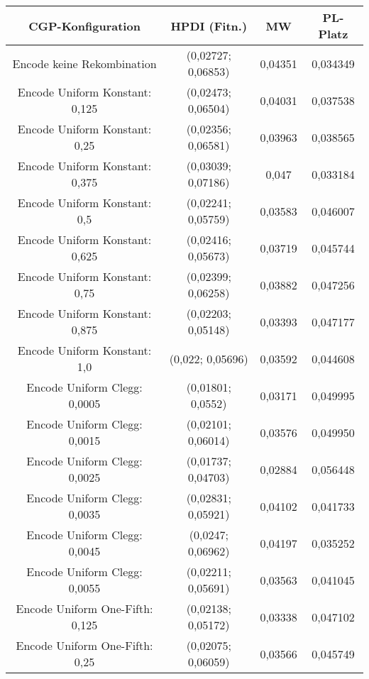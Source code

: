 \begin{table}[H]
	\centering
	\begin{tabular}{c | c | c | c}
		\textbf{CGP-Konfiguration} & \textbf{HPDI (Fitn.)} & \textbf{MW} & \textbf{PL-Platz}\\
		\hline
		Encode keine Rekombination & (0,02727; 0,06853) &\color{red} 0,04351\color{black} & \color{red}0,034349\color{black}\\
		\hline
		\hline
		Encode Uniform Konstant: 0,125 & (0,02473; 0,06504) & 0,04031 & 0,037538\\
		\hline
		Encode Uniform Konstant: 0,25 & \color{red}(0,02356; 0,06581)\color{black} & 0,03963 & 0,038565\\
		\hline
		Encode Uniform Konstant: 0,375 & (0,03039; 0,07186) & \color{red}0,047\color{black} & \color{red}0,033184\color{black}\\
		\hline
		Encode Uniform Konstant: 0,5 & (0,02241; 0,05759) & 0,03583 & 0,046007\\
		\hline
		Encode Uniform Konstant: 0,625 & (0,02416; 0,05673) & 0,03719 & 0,045744\\
		\hline
		Encode Uniform Konstant: 0,75 & (0,02399; 0,06258) & 0,03882 & 0,047256\\
		\hline
		Encode Uniform Konstant: 0,875 & \color{Green}(0,02203; 0,05148)\color{black} & 0,03393 & 0,047177\\
		\hline
		Encode Uniform Konstant: 1,0 & (0,022; 0,05696) & 0,03592 & 0,044608\\
		\hline
		\hline
		Encode Uniform Clegg: 0,0005 & (0,01801; 0,0552) & \color{Green}0,03171\color{black} & \color{Green}0,049995\color{black}\\
		\hline
		Encode Uniform Clegg: 0,0015 & (0,02101; 0,06014) & 0,03576 & 0,049950\\
		\hline
		Encode Uniform Clegg: 0,0025 & \color{Green}(0,01737; 0,04703)\color{black} & \color{Green}0,02884\color{black} & \color{Green}0,056448\color{black}\\
		\hline
		Encode Uniform Clegg: 0,0035 & (0,02831; 0,05921) & 0,04102 & 0,041733\\
		\hline
		Encode Uniform Clegg: 0,0045 & \color{red}(0,0247; 0,06962)\color{black} & 0,04197 & 0,035252\\
		\hline
		Encode Uniform Clegg: 0,0055 & (0,02211; 0,05691) & 0,03563 & 0,041045\\
		\hline
		\hline
		Encode Uniform One-Fifth: 0,125 & (0,02138; 0,05172) & 0,03338 & 0,047102\\
		\hline
		Encode Uniform One-Fifth: 0,25 & (0,02075; 0,06059) & 0,03566 & 0,045749\\

\end{tabular}
\end{table}
